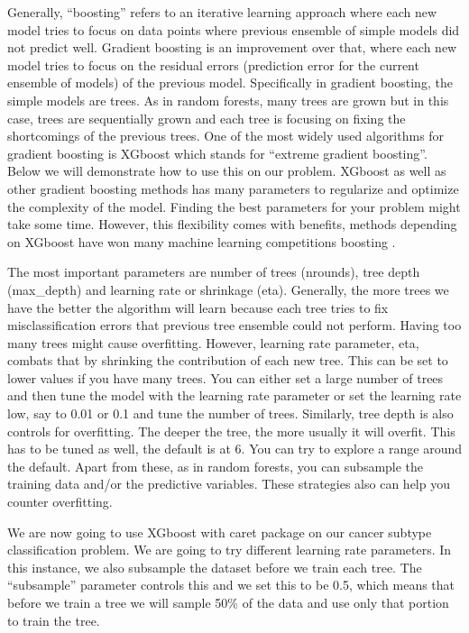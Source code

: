 \documentclass[12pt,]{krantz}
\begin{document}
Generally, ``boosting'' refers to an iterative learning approach where each new model tries to focus on data points where previous ensemble of simple models did not predict well. Gradient boosting is an improvement over that, where each new model tries to focus on the residual errors (prediction error for the current ensemble of models) of the previous model. Specifically in gradient boosting, the simple models are trees. As in random forests, many trees are grown but in this case, trees are sequentially grown and each tree is focusing on fixing the shortcomings of the previous trees. One of the most widely used algorithms for gradient boosting is XGboost which stands for ``extreme gradient boosting''\citep{chen2016xgboost}. Below we will demonstrate how to use this on our problem. XGboost as well as other gradient boosting methods has many parameters to regularize and optimize the complexity of the model. Finding the best parameters for your problem might take some time. However, this flexibility comes with benefits, methods depending on XGboost have won many machine learning competitions boosting \citep{chen2016xgboost}.

The most important parameters are number of trees (nrounds), tree depth (max\_depth) and learning rate or shrinkage (eta). Generally, the more trees we have the better the algorithm will learn because each tree tries to fix misclassification errors that previous tree ensemble could not perform. Having too many trees might cause overfitting. However, learning rate parameter, eta, combats that by shrinking the contribution of each new tree. This can be set to lower values if you have many trees. You can either set a large number of trees and then tune the model with the learning rate parameter or set the learning rate low, say to 0.01 or 0.1 and tune the number of trees. Similarly, tree depth is also controls for overfitting. The deeper the tree, the more usually it will overfit. This has to be tuned as well, the default is at 6. You can try to explore a range around the default. Apart from these, as in random forests, you can subsample the training data and/or the predictive variables. These strategies also can help you counter overfitting.

We are now going to use XGboost with caret package on our cancer subtype classification problem. We are going to try different learning rate parameters. In this instance, we also subsample the dataset before we train each tree. The ``subsample'' parameter controls this and we set this to be 0.5, which means that before we train a tree we will sample 50\% of the data and use only that portion to train the tree.
\end{document}
